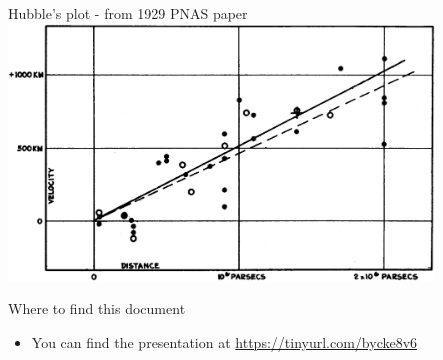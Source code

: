 \documentclass[usenames,dvipsnames,12pt,compress]{beamer}
\begin{document}
\begin{frame}{Hubble's plot - from 1929 PNAS paper}
\includegraphics[height=6.8cm]{F2.large.jpg}
\end{frame}








\begin{frame}{Where to find this document}
  \begin{block}{}
  \begin{itemize}
  \item{You can find the presentation at \alert{\url{https://tinyurl.com/bycke8v6}}}
  \end{itemize}
  \end{block}
\end{frame}
\end{document}

